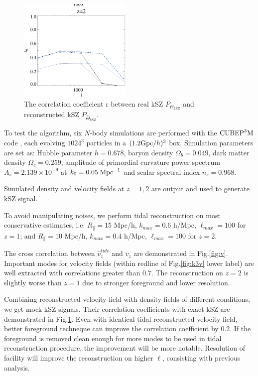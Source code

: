 \begin{figure}[tbp]
\begin{center}
\includegraphics[width=0.48\textwidth]{figure/cl_correlation_z1_z2.eps}
\end{center}
\vspace{-0.7cm}
\caption{The correlation coefficient r between real kSZ $P_{\Theta_{kSZ}}$ 
and reconstructed kSZ $P_{\hat \Theta_{kSZ}}$.
}
\label{fig:r}
\end{figure}
\label{ssec:tide}

To test the algorithm, six $N$-body simulations are performed with the
$\mathrm{CUBEP}^3\mathrm{M}$ code \cite{2013:code}, each evolving $1024^3$ particles in a $(1.2\mathrm{Gpc}/h)^3$ box. 
Simulation parameters are set as: Hubble parameter $h=0.678$, baryon
density $\Omega_{b}=0.049$, dark matter density $\Omega_{c}=0.259$,
amplitude of primordial curvature power spectrum $A_s=2.139\times10^{-9}$ at 
$k_0=0.05\;\mathrm{Mpc}^{-1}$ and scalar spectral index $n_s=0.968$.

Simulated density and velocity fields at $z=1,2$ are output 
and used to generate kSZ signal. 


To avoid manipulating noises, 
we perform tidal reconstruction on most conservative estimates, i.e. 
$R_\parallel=15$ Mpc/h, $k_{max}=0.6$ h/Mpc, $\ell_{max}=100$ for $z=1$; 
and $R_\parallel=10$ Mpc/h, $k_{max}=0.4$ h/Mpc, $\ell_{max}=100$ for $z=2$. 

The cross correlation between $\hat v_z^{tide}$ and $v_z$ are demonstrated in Fig.\ref{fig:v}. 
Important modes for velocity fields (within redline of Fig.\ref{fig:k3v} lower label) are well extracted with correlations greater than $0.7$. 
The reconstruction on $z=2$ is slightly worse than $z=1$ 
due to stronger foreground and lower resolution. 

Combining reconstructed velocity field with density fields of different conditions, we get mock kSZ signals. 
Their correlation coefficients with exact kSZ are 
demonstrated in Fig.\ref{fig:r}. 
Even with identical tidal reconstructed velocity field, 
better foreground techneque can improve the correlation coefficient by 0.2. 
If the foreground is removed clean enough for more modes to be 
used in tidal reconstruction procedure, 
the improvement will be more notable.
Resolution of facility will improve the reconstruction on higher $\ell$, 
consisting with previous analysis.



